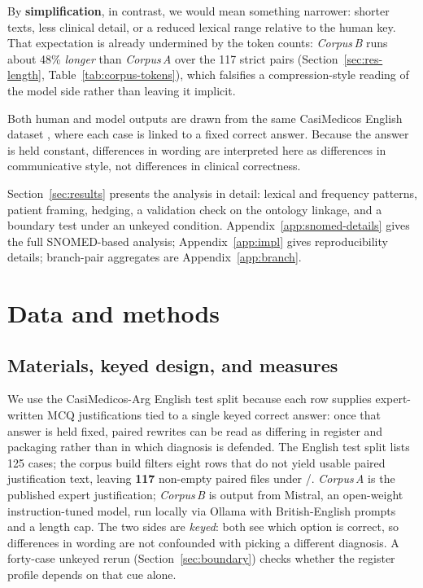 \documentclass[11pt,a4paper]{article}
\newcommand{\CA}{\emph{Corpus\,A}}
\newcommand{\CB}{\emph{Corpus\,B}}
\begin{document}
By \textbf{simplification}, in contrast, we would mean something narrower: shorter texts, less clinical detail, or a reduced lexical range relative to the human key. That expectation is already undermined by the token counts: \CB{} runs about 48\% \emph{longer} than \CA{} over the 117 strict pairs (Section~\ref{sec:res-length}, Table~\ref{tab:corpus-tokens}), which falsifies a compression-style reading of the model side rather than leaving it implicit.

Both human and model outputs are drawn from the same CasiMedicos English dataset \cite{casimedicos}, where each case is linked to a fixed correct answer. Because the answer is held constant, differences in wording are interpreted here as differences in communicative style, not differences in clinical correctness.

Section~\ref{sec:results} presents the analysis in detail: lexical and frequency patterns, patient framing, hedging, a validation check on the ontology linkage, and a boundary test under an unkeyed condition. Appendix~\ref{app:snomed-details} gives the full SNOMED-based analysis; Appendix~\ref{app:impl} gives reproducibility details; branch-pair aggregates are Appendix~\ref{app:branch}.

\section{Data and methods}
\label{sec:methods}

\subsection{Materials, keyed design, and measures}
\label{sec:case-layout}
We use the CasiMedicos-Arg English test split \cite{casimedicos} because each row supplies expert-written MCQ justifications tied to a single keyed correct answer: once that answer is held fixed, paired rewrites can be read as differing in register and packaging rather than in which diagnosis is defended. The English test split lists 125 cases; the corpus build filters eight rows that do not yield usable paired justification text, leaving \textbf{117} non-empty paired files under /. \CA{} is the published expert justification; \CB{} is output from Mistral, an open-weight instruction-tuned model, run locally via Ollama with British-English prompts and a length cap. The two sides are \emph{keyed}: both see which option is correct, so differences in wording are not confounded with picking a different diagnosis. A forty-case unkeyed rerun (Section~\ref{sec:boundary}) checks whether the register profile depends on that cue alone.
\end{document}

